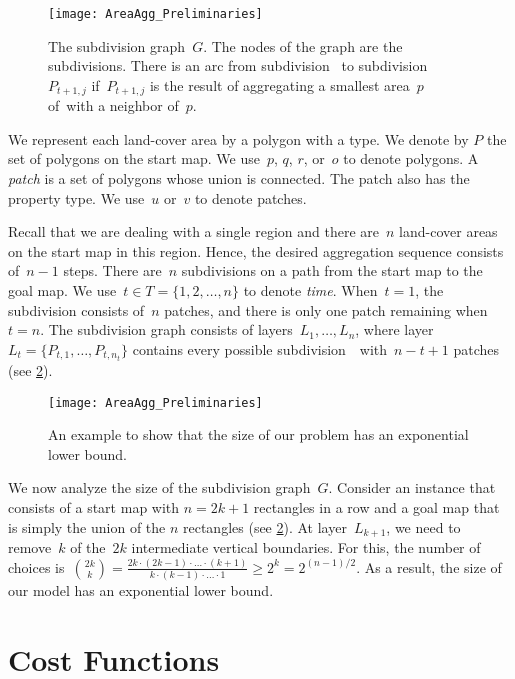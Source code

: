 \documentclass[acmsmall,natbib=false]{acmart}
\begin{document}
\begin{figure}[tb]
\centering
\texttt{[image: AreaAgg\_Preliminaries]}
\caption{The subdivision graph~$G$. 
	The nodes of the graph are the subdivisions. 
	There is an arc	from subdivision~\Pnode 
	to subdivision~${P}_{t+1,j}$ 
	if~${P}_{t+1,j}$ is the result of 
	aggregating a smallest area~$p$ of~\Pnode with a 
	neighbor of~$p$.}
\label{fig:AreaAgg_SubdivisionName}
\end{figure}

We represent each land-cover area by a polygon with a type.
We denote by $P$ the set of polygons on the start map.
We use~$p$, $q$, $r$, or~$o$ to denote polygons.
A \emph{patch} is a set of polygons whose union is connected. 
The patch also has the property type.
We use~$u$ or~$v$ to denote patches.


Recall that we are dealing with a single region and 
there are~$n$ land-cover areas on the start map in this region. 
Hence, the desired aggregation sequence consists of~$n-1$ steps. 
There are~$n$ subdivisions on a path 
from the start map to the goal map. 
We use~$t \in {T}=\{1,2,\dots,n\}$ to denote \emph{time}. 
When~$t=1$, the subdivision consists of~$n$ patches, 
and there is only one patch remaining when~$t=n$.
The subdivision graph consists of layers~${L}_1,\dots,{L}_n$, 
where layer~${L}_t=\{{P}_{t,1},\dots,{P}_{t,n_t}\}$
contains every possible subdivision~\Pnode\ with~$n-t+1$ patches (see \fig\ref{fig:AreaAgg_ExponentialSize}).

\begin{figure}[tb]
\centering
\texttt{[image: AreaAgg\_Preliminaries]}
\caption{An example to show that the size of our problem 
	has an exponential lower bound.}
\label{fig:AreaAgg_ExponentialSize}
\end{figure}

We now analyze the size of the subdivision graph~$G$.
Consider an instance that consists of 
a start map with $n=2k+1$ rectangles in a row and
a goal map that is simply the union of the $n$ rectangles
(see \fig\ref{fig:AreaAgg_ExponentialSize}).
At layer~$L_{k+1}$, we need to remove~$k$ of the~$2k$ 
intermediate vertical boundaries. 
For this, the number of choices is~$
{{2k}\choose{k}}
= \frac{2k\cdot (2k-1)\cdot \ldots \cdot (k+1)}
{k\cdot (k-1)\cdot \ldots \cdot 1}
\ge 2^k = 2^{(n-1)/2}$.
As a result, the size of our model
has an exponential lower bound.


\section{Cost Functions}
\label{sec:AreaAgg_CostFunctions}
\end{document}
